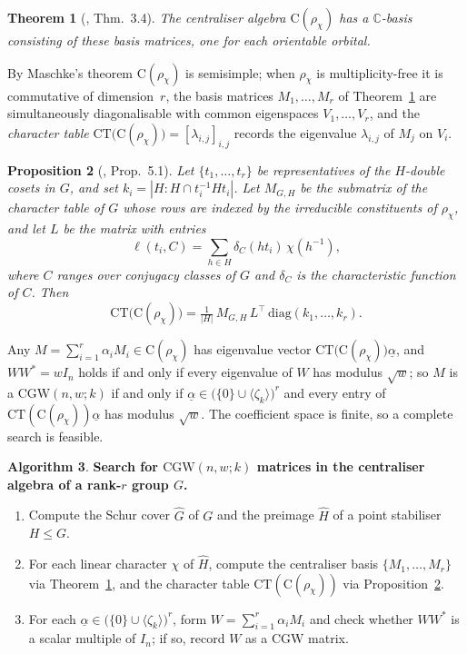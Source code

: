 \documentclass{article}
\newtheorem{theorem}{Theorem}[section]
\newtheorem{proposition}[theorem]{Proposition}
\theoremstyle{definition}
\newtheorem{algorithm}[theorem]{Algorithm}
\theoremstyle{remark}
\newcommand{\Cr}{\mathrm{C}}
\newcommand{\CGW}{\mathrm{CGW}}
\newcommand{\diag}{\mathrm{diag}}
\newcommand{\CT}{\mathrm{CT}}
\begin{document}
\begin{theorem}[\cite{Monrep}, Thm.~3.4]\label{thm:basis}
The centraliser algebra $\Cr(\rho_\chi)$ has a $\mathbb{C}$-basis
consisting of these basis matrices, one for each orientable orbital.
\end{theorem}

By Maschke's theorem $\Cr(\rho_\chi)$ is semisimple; when $\rho_\chi$ is
multiplicity-free it is commutative of dimension~$r$, the basis matrices
$M_1, \ldots, M_r$ of Theorem~\ref{thm:basis} are simultaneously
diagonalisable with common eigenspaces $V_1, \ldots, V_r$, and the
\textit{character table} $\CT\bigl(\Cr(\rho_\chi)\bigr) =
[\lambda_{i,j}]_{i,j}$ records the eigenvalue $\lambda_{i,j}$ of $M_j$
on $V_i$.

\begin{proposition}[\cite{Monrep}, Prop.~5.1]\label{prop:CT}
Let $\{t_1, \ldots, t_r\}$ be representatives of the $H$-double cosets in $G$, and set $k_i = |H : H \cap t_i^{-1}Ht_i|$. Let $M_{G,H}$ be the submatrix of the character table of $G$ whose rows are indexed by the irreducible constituents of $\rho_\chi$, and let $L$ be the matrix with entries
\[
\ell(t_i, C) = \sum_{h \in H} \delta_C(ht_i)\,\chi(h^{-1}),
\]
where $C$ ranges over conjugacy classes of $G$ and $\delta_C$ is the characteristic function of $C$. Then
\[
\CT\bigl(\Cr(\rho_\chi)\bigr) = \tfrac{1}{|H|}\, M_{G,H}\, L^{\top}\, \diag(k_1, \ldots, k_r).
\]
\end{proposition}

Any $M = \sum_{i=1}^r \alpha_i M_i \in \Cr(\rho_\chi)$ has eigenvalue vector $\CT\bigl(\Cr(\rho_\chi)\bigr)\underline{\alpha}$, and $WW^* = wI_n$ holds if and only if every eigenvalue of $W$ has modulus $\sqrt{w}$; so $M$ is a $\CGW(n,w;k)$ if and only if $\underline{\alpha} \in \bigl(\{0\} \cup \langle\zeta_k\rangle\bigr)^r$ and every entry of $\CT(\Cr(\rho_\chi))\underline{\alpha}$ has modulus $\sqrt{w}$.  The coefficient space is finite, so a complete search is feasible.

\begin{algorithm}\label{alg:search}
\textbf{Search for $\CGW(n,w;k)$ matrices in the centraliser algebra of a rank-$r$ group $G$.}
\begin{enumerate}
\item Compute the Schur cover $\widehat{G}$ of $G$ and the preimage $\widehat{H}$ of a point stabiliser $H \leq G$.
\item For each linear character $\chi$ of $\widehat{H}$, compute the centraliser basis $\{M_1, \ldots, M_r\}$ via Theorem~\ref{thm:basis}, and the character table $\CT(\Cr(\rho_\chi))$ via Proposition~\ref{prop:CT}.
\item For each $\underline{\alpha} \in \bigl(\{0\} \cup \langle\zeta_k\rangle\bigr)^r$, form $W = \sum_{i=1}^r \alpha_i M_i$ and check whether $WW^{\ast}$ is a scalar multiple of $I_n$; if so, record $W$ as a $\CGW$ matrix.
\end{enumerate}
\end{algorithm}
\end{document}
